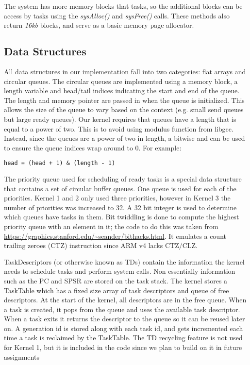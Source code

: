\documentclass[twoside,a4paper]{refart}
\begin{document}
The system has more memory blocks that tasks, so the additional blocks can be access by tasks using the \textit{sysAlloc()} and \textit{sysFree()} calls. These methods also return \textit{16kb} blocks, and serve as a basic memory page allocator.

\subsection{Data Structures}
All data structures in our implementation fall into two categories: flat arrays and circular queues. The circular queues are implemented using a memory block, a length variable and head/tail indices indicating the start and end of the queue. The length and memory pointer are passed in when the queue is initialized. This allows the size of the queue to vary based on the context (e.g. small send queues but large ready queues). Our kernel requires that queues have a length that is equal to a power of two. This is to avoid using modulus function from libgcc. Instead, since the queues are a power of two in length, a bitwise and can be used to ensure the queue indices wrap around to 0. For example:

\begin{verbatim}
head = (head + 1) & (length - 1)
\end{verbatim}

The priority queue used for scheduling of ready tasks is a special data structure that contains a set of circular buffer queues. One queue is used for each of the priorities. Kernel 1 and 2 only used three priorities, however in Kernel 3 the number of priorities was increased to 32. A 32 bit integer is used to determine which queues have tasks in them. Bit twiddling is done to compute the highest priority queue with an element in it; the code to do this was taken from \url{https://graphics.stanford.edu/~seander/bithacks.html}. It emulates a count trailing zeroes (CTZ) instruction since ARM v4 lacks CTZ/CLZ.

TaskDescriptors (or otherwise known as TDs) contain the information the kernel needs to schedule tasks and perform system calls. Non essentially information such as the PC and SPSR are stored on the task stack. The kernel stores a TaskTable which has a fixed size array of task descriptors and queue of free descriptors. At the start of the kernel, all descriptors are in the free queue. When a task is created, it pops from the queue and uses the available task descriptor. When a task exits it returns the descriptor to the queue so it can be reused later on. A generation id is stored along with each task id, and gets incremented each time a task is reclaimed by the TaskTable. The TD recycling feature is not used for Kernel 1, but it is included in the code since we plan to build on it in future assignments
\end{document}
